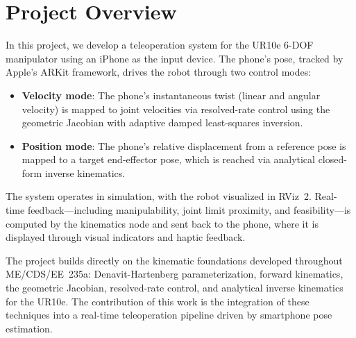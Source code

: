 \section{Project Overview}
In this project, we develop a teleoperation system for the UR10e 6-DOF manipulator using an iPhone as the input device. The phone's pose, tracked by Apple's ARKit framework, drives the robot through two control modes:
\begin{itemize}
    \item \textbf{Velocity mode}: The phone's instantaneous twist (linear and angular velocity) is mapped to joint velocities via resolved-rate control using the geometric Jacobian with adaptive damped least-squares inversion.
    \item \textbf{Position mode}: The phone's relative displacement from a reference pose is mapped to a target end-effector pose, which is reached via analytical closed-form inverse kinematics.
\end{itemize}

The system operates in simulation, with the robot visualized in RViz~2. Real-time feedback---including manipulability, joint limit proximity, and feasibility---is computed by the kinematics node and sent back to the phone, where it is displayed through visual indicators and haptic feedback.

The project builds directly on the kinematic foundations developed throughout ME/CDS/EE~235a: Denavit-Hartenberg parameterization, forward kinematics, the geometric Jacobian, resolved-rate control, and analytical inverse kinematics for the UR10e. The contribution of this work is the integration of these techniques into a real-time teleoperation pipeline driven by smartphone pose estimation.
